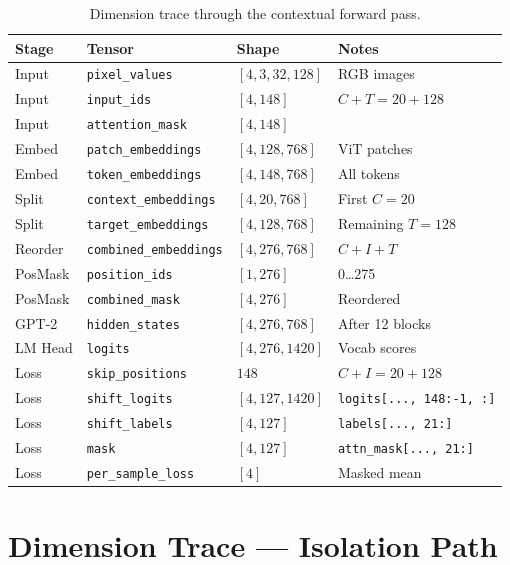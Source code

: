 \documentclass[11pt, a4paper]{report}
\begin{document}
\begin{table}[h]
\centering
\caption{Dimension trace through the contextual forward pass.}
\label{tab:dim-trace-ctx}
\small
\begin{tabular}{llll}
\toprule
\textbf{Stage} & \textbf{Tensor} & \textbf{Shape} & \textbf{Notes} \\
\midrule
Input & \texttt{pixel\_values} & $[4, 3, 32, 128]$ & RGB images \\
Input & \texttt{input\_ids} & $[4, 148]$ & $C{+}T = 20{+}128$ \\
Input & \texttt{attention\_mask} & $[4, 148]$ & \\
\midrule
Embed & \texttt{patch\_embeddings} & $[4, 128, 768]$ & ViT patches \\
Embed & \texttt{token\_embeddings} & $[4, 148, 768]$ & All tokens \\
Split & \texttt{context\_embeddings} & $[4, 20, 768]$ & First $C{=}20$ \\
Split & \texttt{target\_embeddings} & $[4, 128, 768]$ & Remaining $T{=}128$ \\
\midrule
Reorder & \texttt{combined\_embeddings} & $[4, 276, 768]$ & $C{+}I{+}T$ \\
PosMask & \texttt{position\_ids} & $[1, 276]$ & 0\ldots275 \\
PosMask & \texttt{combined\_mask} & $[4, 276]$ & Reordered \\
\midrule
GPT-2 & \texttt{hidden\_states} & $[4, 276, 768]$ & After 12 blocks \\
LM Head & \texttt{logits} & $[4, 276, 1420]$ & Vocab scores \\
\midrule
Loss & \texttt{skip\_positions} & $148$ & $C{+}I = 20{+}128$ \\
Loss & \texttt{shift\_logits} & $[4, 127, 1420]$ & \texttt{logits[..., 148:-1, :]} \\
Loss & \texttt{shift\_labels} & $[4, 127]$ & \texttt{labels[..., 21:]} \\
Loss & \texttt{mask} & $[4, 127]$ & \texttt{attn\_mask[..., 21:]} \\
Loss & \texttt{per\_sample\_loss} & $[4]$ & Masked mean \\
\bottomrule
\end{tabular}
\end{table}


\section{Dimension Trace --- Isolation Path}
\label{sec:dim-trace-iso}
\end{document}
